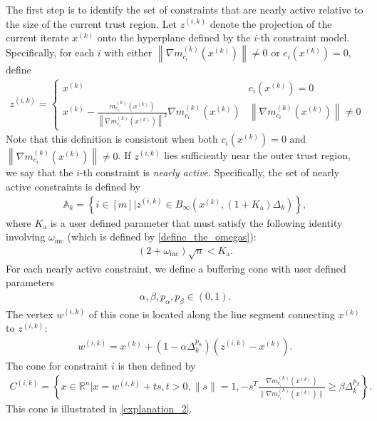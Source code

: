\documentclass{article}
\theoremstyle{case}
\numberwithin{theorem}{subsection}
\newcommand{\activeconstraintsk}{{\mathbb A_{k}}}
\newcommand{\dk}{\Delta_k}
\newcommand{\gmcik}{{\nabla m_{c_i}^{(k)}\left(\xk\right)}}
\newcommand{\hgik}{{\frac{\nabla m^{(k)}_{c_i}(\xk)}{\|\nabla m^{(k)}_{c_i}\left(\xk\right)\|}}}
\newcommand{\omegainc}{\omega_{\text{inc}}}
\newcommand{\Rn}{\mathbb R^n}
\newcommand{\wik}{{w^{(i, k)}}}
\newcommand{\xk}{x^{(k)}}
\newcommand{\zik}{{z^{(i, k)}}}
\newcommand{\fik}{{C^{(i, k)}}}
\newcommand{\zikthresh}{{ K_{\textrm{a}} }}
\begin{document}
The first step is to identify the set of constraints that are nearly active relative to the size of the current trust region.
Let $\zik$ denote the projection of the current iterate $\xk$ onto the hyperplane defined by the $i$-th constraint model.
Specifically, for each $i$ with either $\left\|\gmcik\right\| \ne 0$ or $c_i\left(\xk\right) = 0$, define
\begin{align}
\label{define_z}
\zik =
\begin{cases}
\xk &  c_i\left(\xk\right) = 0 \\
\xk - \frac{m^{(k)}_{c_i}\left(\xk\right)}{\left\|\gmcik\right\|^2} \gmcik & \left\|\gmcik\right\| \ne 0
\end{cases}
\end{align}
Note that this definition is consistent when both $c_i\left(\xk\right) = 0$ and $\left\|\gmcik\right\| \ne 0$.
If $\zik$ lies sufficiently near the outer trust region, we say that the $i$-th constraint is \emph{nearly active}.
Specifically, the set of nearly active constraints is defined by
\begin{align}
\activeconstraintsk = \left\{i \in [m] \bigg| \zik \in B_{\infty}\left(\xk, (1+\zikthresh)\dk\right)\right\}, \label{define_activeconstraints}
\end{align}
where $\zikthresh$ is a user defined parameter that must satisfy the following identity involving $\omegainc$ (which is defined by \cref{define_the_omegas}):
\begin{align}
(2 + \omegainc)\sqrt{n} < \zikthresh. \label{define_zikthresh}
\end{align}
For each nearly active constraint, we define a buffering cone with user defined parameters
\begin{align}
\alpha, \beta, p_{\alpha}, p_{\beta} \in (0, 1). \label{define_abpab}
\end{align}
The vertex $\wik$ of this cone is located along the line segment connecting $\xk$ to $\zik$:
\begin{align}
\wik = \xk + \left(1 - \alpha\dk^{p_{\alpha}}\right)\left(\zik - \xk\right). \label{define_w}
\end{align}
The cone for constraint $i$ is then defined by
\begin{align}
\fik = \left\{x \in \Rn | x = \wik + t s,t > 0, \|s\| = 1, -s^T\hgik \ge \beta \dk^{p_{\beta}} \right\}. \label{define_fik}
\end{align}
This cone is illustrated in \cref{explanation_2}.
\end{document}

